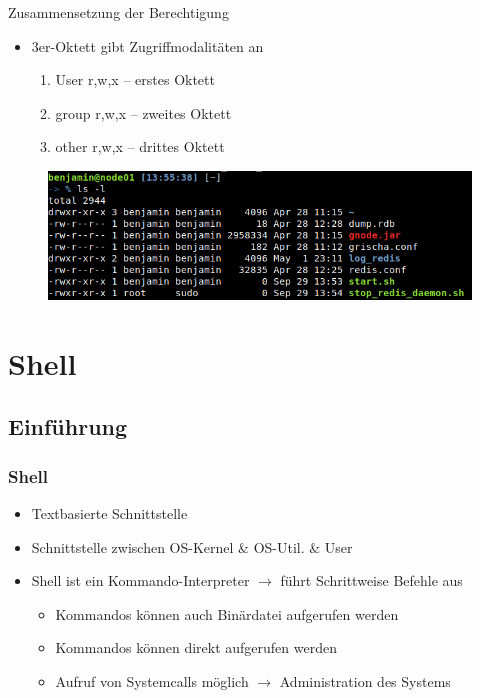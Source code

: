 \documentclass[xcolor=dvipsnames,aspectratio=169]{beamer}
\begin{document}
\begin{frame}
Zusammensetzung der Berechtigung
\begin{itemize}
	\item 3er-Oktett gibt Zugriffmodalitäten an
	\begin{enumerate}
		\item User r,w,x -- erstes Oktett
		\item group r,w,x -- zweites Oktett
		\item other r,w,x -- drittes Oktett
	\end{enumerate}
\end{itemize}
\begin{figure}
	\includegraphics[scale=0.5]{rights}
\end{figure}
\end{frame}

\section{Shell}
\subsection{Einführung}
\begin{frame}
	\frametitle{Shell}
	\begin{itemize}
		\item Textbasierte Schnittstelle
		\item Schnittstelle zwischen OS-Kernel \& OS-Util. \& User
		\item Shell ist ein Kommando-Interpreter $\rightarrow$ führt Schrittweise Befehle aus
		\begin{itemize}
			\item Kommandos können auch Binärdatei aufgerufen werden
			\item Kommandos können direkt aufgerufen werden
			\item Aufruf von Systemcalls möglich $\rightarrow$ Administration des Systems
		\end{itemize}
	\end{itemize}
\end{frame}
\end{document}
